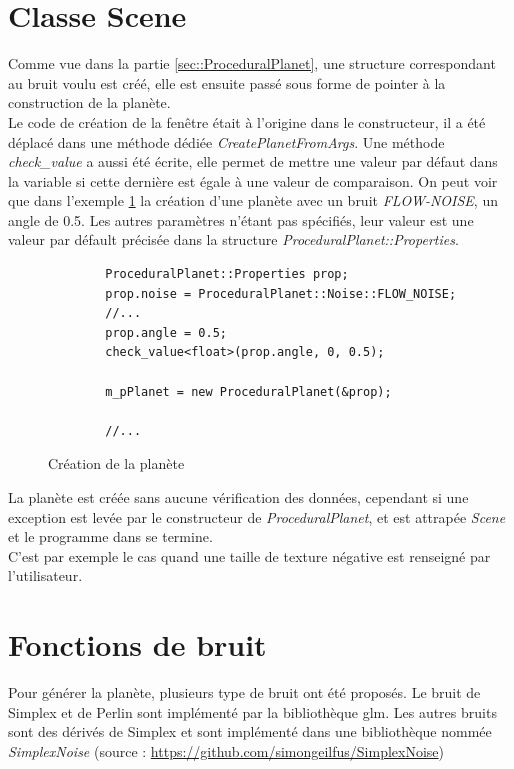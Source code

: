   \section{Classe Scene}
  Comme vue dans la partie \ref{sec::ProceduralPlanet}, une structure correspondant au bruit voulu est créé,
  elle est ensuite passé sous forme de pointer à la construction de la planète.\\
  
  Le code de création de la fenêtre était à l'origine dans le constructeur, il a été déplacé dans une méthode dédiée \textit{CreatePlanetFromArgs}. Une méthode \textit{check_value} a aussi été écrite, elle permet de mettre une valeur par défaut dans la variable si cette dernière est égale à une valeur de comparaison. On peut voir que dans l'exemple \ref{fig:code_scene} la création d'une planète avec un bruit \textit{FLOW-NOISE}, un angle de 0.5. Les autres paramètres n'étant pas spécifiés, leur valeur est une valeur par défault précisée dans la structure \textit{ProceduralPlanet::Properties}.
  
  \begin{figure}
    \centering
      \lstset{language=C++}
      \begin{lstlisting}
        ProceduralPlanet::Properties prop;
        prop.noise = ProceduralPlanet::Noise::FLOW_NOISE;
        //...
        prop.angle = 0.5;
        check_value<float>(prop.angle, 0, 0.5);
        
        m_pPlanet = new ProceduralPlanet(&prop);
            
        //...
      \end{lstlisting}    
      \caption{Création de la planète}
      \label{fig:code_scene}
  \end{figure}
  
  
  La planète est créée sans aucune vérification des données, cependant si une exception est levée par le constructeur de \textit{ProceduralPlanet}, et est attrapée \textit{Scene} et le programme dans se termine.\\
  C'est par exemple le cas quand une taille de texture négative est renseigné par l'utilisateur.
  
  \section{Fonctions de bruit}
  
  Pour générer la planète, plusieurs type de bruit ont été proposés. Le bruit de Simplex et de Perlin sont implémenté par la bibliothèque glm. Les autres bruits sont des dérivés de Simplex et sont implémenté dans une bibliothèque nommée \textit{SimplexNoise} (source : \url{https://github.com/simongeilfus/SimplexNoise})
  
